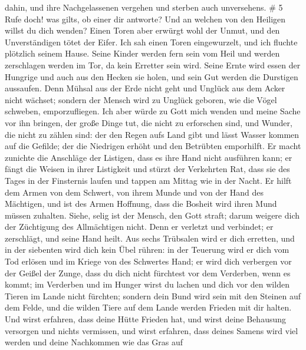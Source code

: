 dahin,  und ihre Nachgelassenen vergehen und sterben auch
unversehens. \# 5  Rufe doch! was gilts, ob einer dir
antworte? Und an welchen von den Heiligen willst du dich wenden?
 Einen Toren aber erwürgt wohl der Unmut, und den
Unverständigen tötet der Eifer.  Ich sah einen Toren
eingewurzelt, und ich fluchte plötzlich seinem Hause.  Seine
Kinder werden fern sein vom Heil und werden zerschlagen werden im Tor,
da kein Erretter sein wird.  Seine Ernte wird essen der
Hungrige und auch aus den Hecken sie holen, und sein Gut werden die
Durstigen aussaufen.  Denn Mühsal aus der Erde nicht geht
und Unglück aus dem Acker nicht wächset;  sondern der Mensch
wird zu Unglück geboren, wie die Vögel schweben, emporzufliegen.
 Ich aber würde zu Gott mich wenden und meine Sache vor ihn
bringen,  der große Dinge tut, die nicht zu erforschen sind,
und Wunder, die nicht zu zählen sind:  der den Regen aufs
Land gibt und lässt Wasser kommen auf die Gefilde;  der die
Niedrigen erhöht und den Betrübten emporhilft.  Er macht
zunichte die Anschläge der Listigen, dass es ihre Hand nicht ausführen
kann;  er fängt die Weisen in ihrer Listigkeit und stürzt
der Verkehrten Rat,  dass sie des Tages in der Finsternis
laufen und tappen am Mittag wie in der Nacht.  Er hilft dem
Armen von dem Schwert, von ihrem Munde und von der Hand des Mächtigen,
 und ist des Armen Hoffnung, dass die Bosheit wird ihren
Mund müssen zuhalten.  Siehe, selig ist der Mensch, den
Gott straft; darum weigere dich der Züchtigung des Allmächtigen nicht.
 Denn er verletzt und verbindet; er zerschlägt, und seine
Hand heilt.  Aus sechs Trübsalen wird er dich erretten, und
in der siebenten wird dich kein Übel rühren:  in der
Teuerung wird er dich vom Tod erlösen und im Kriege von des Schwertes
Hand;  er wird dich verbergen vor der Geißel der Zunge,
dass du dich nicht fürchtest vor dem Verderben, wenn es kommt;
 im Verderben und im Hunger wirst du lachen und dich vor
den wilden Tieren im Lande nicht fürchten;  sondern dein
Bund wird sein mit den Steinen auf dem Felde, und die wilden Tiere auf
dem Lande werden Frieden mit dir halten.  Und wirst
erfahren, dass deine Hütte Frieden hat, und wirst deine Behausung
versorgen und nichts vermissen,  und wirst erfahren, dass
deines Samens wird viel werden und deine Nachkommen wie das Gras auf
